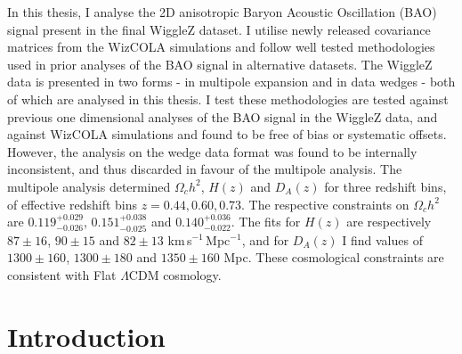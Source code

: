 \documentclass[titlesmallcaps, examinerscopy, copyrightpage]{uqthesis}
\newcommand{\kmsmpc}{km\,s$^{-1}$\,Mpc$^{-1}$}
\begin{document}
In this thesis, I analyse the 2D anisotropic Baryon Acoustic Oscillation (BAO) signal present in the final WiggleZ dataset. I utilise newly released covariance matrices from the WizCOLA simulations and follow well tested methodologies used in prior analyses of the BAO signal in alternative datasets. The WiggleZ data is presented in two forms - in multipole expansion and in data wedges - both of which are analysed in this thesis. I test these methodologies are tested against previous one dimensional analyses of the BAO signal in the WiggleZ data, and against WizCOLA simulations and found to be free of bias or systematic offsets. However, the analysis on the wedge data format was found to be internally inconsistent, and thus discarded in favour of the multipole analysis. The multipole analysis determined $\Omega_c h^2$, $H(z)$ and $D_A(z)$ for three redshift bins, of effective redshift bins $z = 0.44, 0.60, 0.73$. The respective constraints on $\Omega_c h^2$ are $0.119^{+0.029}_{-0.026}$, $0.151^{+0.038}_{-0.025}$ and $0.140^{+0.036}_{-0.022}$. The fits for $H(z)$ are respectively  $87 \pm 16$, $90 \pm 15$ and $82 \pm 13$ \kmsmpc, and for $D_A(z)$ I find values of $1300 \pm  160$, $1300 \pm  180$ and $1350 \pm  160$ Mpc. These cosmological constraints are consistent with Flat $\Lambda$CDM cosmology.




\hypersetup{pageanchor=true}

\tableofcontents


\mainmatter


\chapter{Introduction}
\end{document}
